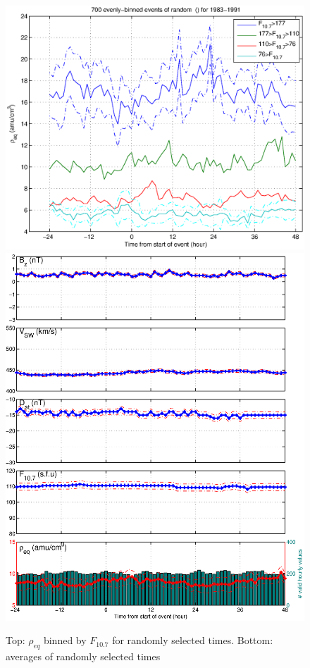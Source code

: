 \documentclass[10pt,twocolumn]{article}
\begin{document}
\begin{figure}[htp!]
\includegraphics[scale=0.45]{paperfigures/HighLowF107rhoeq-random.eps}
\includegraphics[scale=0.45]{paperfigures/stormavs-random.eps}
\caption{Top: $\rho_{eq}$ binned by $F_{10.7}$ for randomly selected times. Bottom: averages of randomly selected times}
\end{figure}
\end{document}
